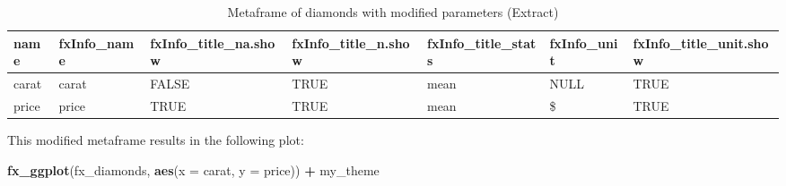 \documentclass[]{report}
\newenvironment{Shaded}{\begin{snugshade}}{\end{snugshade}}
\newcommand{\KeywordTok}[1]{\textcolor[rgb]{0.13,0.29,0.53}{\textbf{#1}}}
\newcommand{\DataTypeTok}[1]{\textcolor[rgb]{0.13,0.29,0.53}{#1}}
\newcommand{\StringTok}[1]{\textcolor[rgb]{0.31,0.60,0.02}{#1}}
\newcommand{\OtherTok}[1]{\textcolor[rgb]{0.56,0.35,0.01}{#1}}
\newcommand{\ControlFlowTok}[1]{\textcolor[rgb]{0.13,0.29,0.53}{\textbf{#1}}}
\newcommand{\OperatorTok}[1]{\textcolor[rgb]{0.81,0.36,0.00}{\textbf{#1}}}
\newcommand{\NormalTok}[1]{#1}
\theoremstyle{definition}
\theoremstyle{definition}
\theoremstyle{definition}
\theoremstyle{remark}
\begin{document}
\begin{Shaded}
\end{Shaded}

\begin{table}

\caption{\label{tab:title-ex}Metaframe of diamonds with modified parameters (Extract)}
\centering
\begin{tabular}[t]{lllllll}
\toprule
name & fxInfo\_name & fxInfo\_title\_na.show & fxInfo\_title\_n.show & fxInfo\_title\_stats & fxInfo\_unit & fxInfo\_title\_unit.show\\
\midrule
carat & carat & FALSE & TRUE & mean & NULL & TRUE\\
price & price & TRUE & TRUE & mean & \$ & TRUE\\
\bottomrule
\end{tabular}
\end{table}

This modified metaframe results in the following plot:

\begin{Shaded}
\begin{Highlighting}[]
\KeywordTok{fx_ggplot}\NormalTok{(fx_diamonds, }\KeywordTok{aes}\NormalTok{(}\DataTypeTok{x =}\NormalTok{ carat, }\DataTypeTok{y =}\NormalTok{ price)) }\OperatorTok{+}\StringTok{ }
\StringTok{  }\NormalTok{my_theme}
\end{Highlighting}
\end{Shaded}
\end{document}
